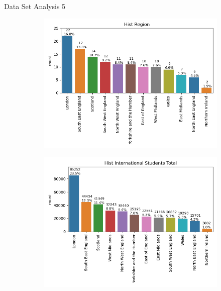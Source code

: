 \documentclass[xcolor=table]{beamer} %
\begin{document}
\begin{frame}{Data Set Analysis 5}
  \vspace{-1cm}
  \begin{figure}
      \centering
      
      \begin{subfigure}[b]{0.48\textwidth}
        \centering
        \includegraphics[width=\textwidth, trim={0 0 0 0}, clip]{./figs/bar_hist region.png}
        \label{fig:hist_region}
      \end{subfigure}
      \hfill
      \begin{subfigure}[b]{0.48\textwidth}
          \centering
          \includegraphics[width=\textwidth, trim={0 0 0 0}, clip]{./figs/bar_hist international students total.png}

\end{subfigure}
\end{figure}
\end{frame}
\end{document}
